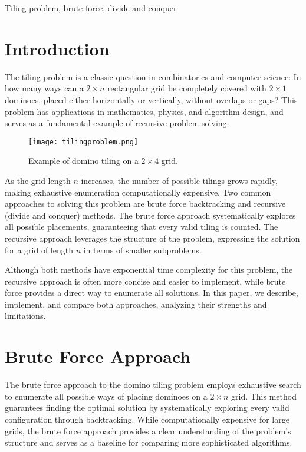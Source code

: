 \documentclass[conference]{IEEEtran}
\begin{document}
\begin{IEEEkeywords}
Tiling problem, brute force, divide and conquer
\end{IEEEkeywords}

\section{Introduction}
The tiling problem is a classic question in combinatorics and computer science: In how many ways can a $2 \times n$ rectangular grid be completely covered with $2 \times 1$ dominoes, placed either horizontally or vertically, without overlaps or gaps? This problem has applications in mathematics, physics, and algorithm design, and serves as a fundamental example of recursive problem solving.

\begin{figure}[htbp]
\centerline{\texttt{[image: tilingproblem.png]}}
\caption{Example of domino tiling on a $2 \times 4$ grid.}
\label{fig:tiling_example}
\end{figure}

As the grid length $n$ increases, the number of possible tilings grows rapidly, making exhaustive enumeration computationally expensive. Two common approaches to solving this problem are brute force backtracking and recursive (divide and conquer) methods. The brute force approach systematically explores all possible placements, guaranteeing that every valid tiling is counted. The recursive approach leverages the structure of the problem, expressing the solution for a grid of length $n$ in terms of smaller subproblems.

Although both methods have exponential time complexity for this problem, the recursive approach is often more concise and easier to implement, while brute force provides a direct way to enumerate all solutions. In this paper, we describe, implement, and compare both approaches, analyzing their strengths and limitations.

\section{Brute Force Approach}

The brute force approach to the domino tiling problem employs exhaustive search to enumerate all possible ways of placing dominoes on a $2 \times n$ grid. This method guarantees finding the optimal solution by systematically exploring every valid configuration through backtracking. While computationally expensive for large grids, the brute force approach provides a clear understanding of the problem's structure and serves as a baseline for comparing more sophisticated algorithms.
\end{document}
